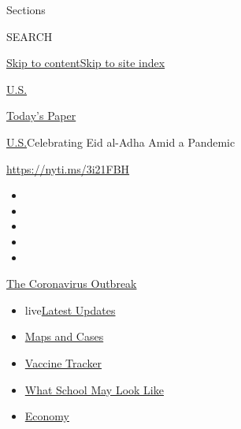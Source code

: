 Sections

SEARCH

\protect\hyperlink{site-content}{Skip to
content}\protect\hyperlink{site-index}{Skip to site index}

\href{https://www.nytimes3xbfgragh.onion/section/us}{U.S.}

\href{https://myaccount.nytimes3xbfgragh.onion/auth/login?response_type=cookie\&client_id=vi}{}

\href{https://www.nytimes3xbfgragh.onion/section/todayspaper}{Today's
Paper}

\href{/section/us}{U.S.}\textbar{}Celebrating Eid al-Adha Amid a
Pandemic

\url{https://nyti.ms/3i21FBH}

\begin{itemize}
\item
\item
\item
\item
\item
\end{itemize}

\href{https://www.nytimes3xbfgragh.onion/news-event/coronavirus?action=click\&pgtype=Article\&state=default\&region=TOP_BANNER\&context=storylines_menu}{The
Coronavirus Outbreak}

\begin{itemize}
\tightlist
\item
  live\href{https://www.nytimes3xbfgragh.onion/2020/08/01/world/coronavirus-covid-19.html?action=click\&pgtype=Article\&state=default\&region=TOP_BANNER\&context=storylines_menu}{Latest
  Updates}
\item
  \href{https://www.nytimes3xbfgragh.onion/interactive/2020/us/coronavirus-us-cases.html?action=click\&pgtype=Article\&state=default\&region=TOP_BANNER\&context=storylines_menu}{Maps
  and Cases}
\item
  \href{https://www.nytimes3xbfgragh.onion/interactive/2020/science/coronavirus-vaccine-tracker.html?action=click\&pgtype=Article\&state=default\&region=TOP_BANNER\&context=storylines_menu}{Vaccine
  Tracker}
\item
  \href{https://www.nytimes3xbfgragh.onion/interactive/2020/07/29/us/schools-reopening-coronavirus.html?action=click\&pgtype=Article\&state=default\&region=TOP_BANNER\&context=storylines_menu}{What
  School May Look Like}
\item
  \href{https://www.nytimes3xbfgragh.onion/live/2020/07/31/business/stock-market-today-coronavirus?action=click\&pgtype=Article\&state=default\&region=TOP_BANNER\&context=storylines_menu}{Economy}
\end{itemize}

